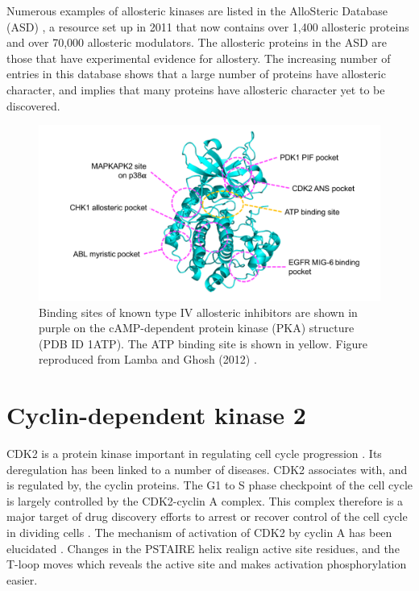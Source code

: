 Numerous examples of allosteric kinases are listed in the AlloSteric Database (ASD) \cite{Shen2016}, a resource set up in 2011 that now contains over 1,400 allosteric proteins and over 70,000 allosteric modulators.
The allosteric proteins in the ASD are those that have experimental evidence for allostery.
The increasing number of entries in this database shows that a large number of proteins have allosteric character, and implies that many proteins have allosteric character yet to be discovered.


\begin{figure}
\centering

\includegraphics[width=\textwidth]{figures/kinase_mods/kinase_mods}

\caption{Binding sites of known type IV allosteric inhibitors are shown in purple on the cAMP-dependent protein kinase (PKA) structure (PDB ID 1ATP).
The ATP binding site is shown in yellow.
Figure reproduced from Lamba and Ghosh (2012) \cite{Lamba2012}.}

\label{fig:kinase_mods}
\end{figure}


\section{Cyclin-dependent kinase 2}

CDK2 is a protein kinase important in regulating cell cycle progression \cite{Peyressatre2015}.
Its deregulation has been linked to a number of diseases.
CDK2 associates with, and is regulated by, the cyclin proteins.
The G1 to S phase checkpoint of the cell cycle is largely controlled by the CDK2-cyclin A complex.
This complex therefore is a major target of drug discovery efforts to arrest or recover control of the cell cycle in dividing cells \cite{Betzi2011}.
The mechanism of activation of CDK2 by cyclin A has been elucidated \cite{Jeffrey1995}.
Changes in the PSTAIRE helix realign active site residues, and the T-loop moves which reveals the active site and makes activation phosphorylation easier.

